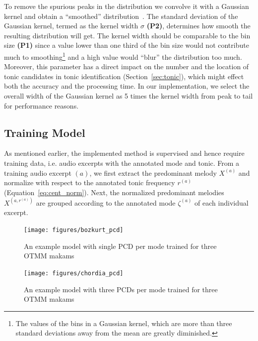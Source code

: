 \documentclass{sig-alternate}
\begin{document}
To remove the spurious peaks in the distribution we convolve it with a Gaussian kernel and obtain a ``smoothed'' distribution~\cite{chordia}. The standard deviation of the Gaussian kernel, termed as the kernel width $\sigma$ {\bf (P2)}, determines how smooth the resulting distribution will get. The kernel width should be comparable to the bin size {\bf (P1)} since a value lower than one third of the bin size would not contribute much to smoothing\footnote{The values of the bins in a Gaussian kernel, which are more than three standard deviations away from the mean are greatly diminished.} and a high value would ``blur''  the distribution too much. Moreover, this parameter has a direct impact on the number and the location of tonic candidates in tonic identification (Section~\ref{sec:tonic}), which might effect both the accuracy and the processing time. In our implementation, we select the overall width of the Gaussian kernel as 5 times the kernel width from peak to tail for performance reasons.

\subsection{Training Model}\label{sec:training}
As mentioned earlier, the implemented method is supervised and hence require training data, i.e. audio excerpts with the annotated mode and tonic. From a training audio excerpt $(a)$, we first extract the predominant me\-lody $X^{(a)}$ and normalize with respect to the annotated tonic frequency $r^{(a)}$ (Equation~\ref{eq:cent_norm}). Next, the normalized predominant melo\-dies $X^{\left(a, r^{(a)}\right)}$ are grouped according to the annotated mode $\zeta^{(a)}$ of each individual excerpt. 

\begin{figure}
\centering
\texttt{[image: figures/bozkurt\_pcd]}
\caption{An example model with single PCD per mode trained for three OTMM makams}
\label{fig:bozkurt_training}
\end{figure}

\begin{figure}
\centering
\texttt{[image: figures/chordia\_pcd]}
\caption{An example model with three PCDs per mode trained for three OTMM makams}
\label{fig:chordia_training}
\end{figure}
\end{document}
